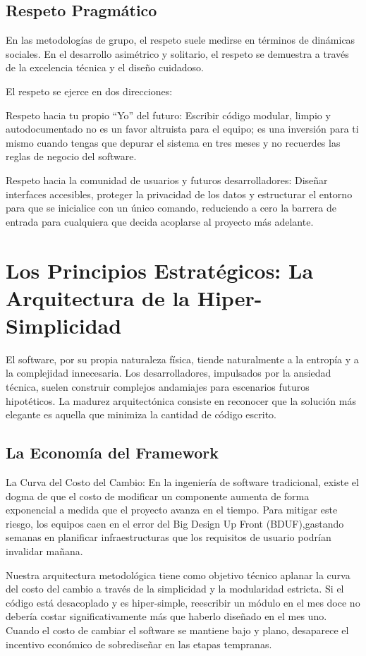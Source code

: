 \documentclass[14pt,a4paper,oneside]{extbook}
\begin{document}
\section{Respeto Pragmático}

En las metodologías de grupo, el respeto suele medirse en términos de dinámicas sociales. En el desarrollo asimétrico y solitario, el respeto se demuestra a través de la excelencia técnica y el diseño cuidadoso.

El respeto se ejerce en dos direcciones:

Respeto hacia tu propio \enquote{Yo} del futuro: Escribir código modular, limpio y autodocumentado no es un favor altruista para el equipo; es una inversión para ti mismo cuando tengas que depurar el sistema en tres meses y no recuerdes las reglas de negocio del software.

Respeto hacia la comunidad de usuarios y futuros desarrolladores: Diseñar interfaces accesibles, proteger la privacidad de los datos y estructurar el entorno para que se inicialice con un único comando, reduciendo a cero la barrera de entrada para cualquiera que decida acoplarse al proyecto más adelante.


\chapter{Los Principios Estratégicos: La Arquitectura de la Hiper-Simplicidad}

El software, por su propia naturaleza física, tiende naturalmente a la entropía y a la complejidad innecesaria. Los desarrolladores, impulsados por la ansiedad técnica, suelen construir complejos andamiajes para escenarios futuros hipotéticos. La madurez arquitectónica consiste en reconocer que la solución más elegante es aquella que minimiza la cantidad de código escrito.

\section{La Economía del Framework}

La Curva del Costo del Cambio: En la ingeniería de software tradicional, existe el dogma de que el costo de modificar un componente aumenta de forma exponencial a medida que el proyecto avanza en el tiempo. Para mitigar este riesgo, los equipos caen en el error del Big Design Up Front (BDUF),gastando semanas en planificar infraestructuras que los requisitos de usuario podrían invalidar mañana.

Nuestra arquitectura metodológica tiene como objetivo técnico aplanar la curva del costo del cambio a través de la simplicidad y la modularidad estricta. Si el código está desacoplado y es hiper-simple, reescribir un módulo en el mes doce no debería costar significativamente más que haberlo diseñado en el mes uno. Cuando el costo de cambiar el software se mantiene bajo y plano, desaparece el incentivo económico de sobrediseñar en las etapas tempranas.
\end{document}

